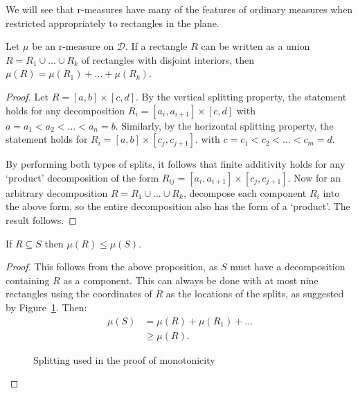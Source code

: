 We will see that r-measures have many of the features of ordinary measures when restricted appropriately to rectangles in the plane.

\begin{proposition}
Let $\mu$ be an r-measure on $\mathcal{D}$. If a rectangle $R$ can be written as a union $R = R_1 \cup \dots \cup R_k$ of rectangles with disjoint interiors, then $\mu(R) = \mu(R_1) + \dots + \mu(R_k)$.
\end{proposition}
\begin{proof}
Let $R = [a, b] \times [c, d]$. By the vertical splitting property, the statement holds for any decomposition $R_i = [a_i, a_{i+1}] \times [c, d]$ with $a = a_1 < a_2 < \dots < a_n = b$. Similarly, by the horizontal splitting property, the statement holds for $R_i = [a, b] \times [c_j, c_{j+1}]$. with $c = c_1 < c_2 < \dots < c_m = d$.

By performing both types of splits, it follows that finite additivity holds for any `product' decomposition of the form $R_{ij} = [a_i, a_{i+1}] \times [c_j, c_{j+1}]$. Now for an arbitrary decomposition $R = R_1 \cup \dots \cup R_k$, decompose each component $R_i$ into the above form, so the entire decomposition also has the form of a `product'. The result follows.
\end{proof}

\begin{proposition}[Monotonicity]
If $R \subseteq S$ then $\mu(R) \leq \mu(S)$.
\end{proposition}
\begin{proof}
This follows from the above proposition, as $S$ must have a decomposition containing $R$ as a component. This can always be done with at most nine rectangles using the coordinates of $R$ as the locations of the splits, as suggested by Figure~\ref{fig:monotonicity}. Then:
\begin{align*}
\mu(S) &= \mu(R) + \mu(R_1) + \dots\\
&\geq \mu(R).
\end{align*}

\begin{figure}[!htb]
\centering
{}

\caption{Splitting used in the proof of monotonicity}
\label{fig:monotonicity}
\end{figure}
\end{proof}


